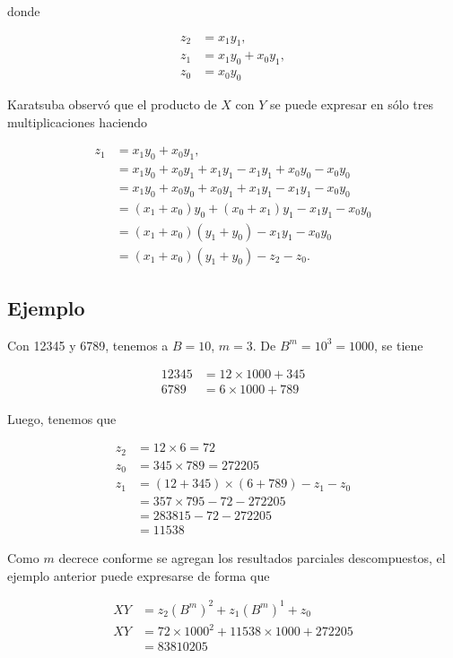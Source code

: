 \documentclass[a4paper,12pt]{article}
\begin{document}
donde 

\begin{align*}
 	z_2 &= x_1 y_1,\\
 	z_1 &= x_1 y_0 + x_0 y_1, \\
  	z_0 &= x_0 y_0
\end{align*}

Karatsuba observó que el producto de $X$ con $Y$ se puede expresar en sólo tres multiplicaciones haciendo

\begin{align*}
 	z_1 &= x_1 y_0 + x_0 y_1, \\
	&= x_1 y_0 + x_0 y_1 + x_1 y_1 - x_1 y_1 + x_0 y_0 - x_0 y_0 \\
	&= x_1 y_0 + x_0 y_0 + x_0 y_1 + x_1 y_1 - x_1 y_1 - x_0 y_0 \\
	&= (x_1 + x_0) y_0 + (x_0 + x_1) y_1 -x_1 y_1 - x_0 y_0\\
 &= 	(x_1 + x_0)(y_1 + y_0) - x_1 y_1 - x_0 y_0\\
	&= (x_1 + x_0)(y_1 + y_0) - z_2 - z_0.
\end{align*}

\subsection*{Ejemplo}
\vspace{1cm}

Con 12345 y 6789, tenemos a $B = 10$, $m = 3$. De $B^m = 10^3 = 1000$, se tiene

\begin{align*}
	12345 &= 12 \times 1000 + 345\\
	6789 &= 6 \times 1000 + 789
\end{align*}

Luego, tenemos que

\begin{align*}
 	z_2 &= 12 \times 6 = 72\\
 	z_0 &= 345 \times 789 = 272205\\
  	z_1 &= (12 + 345) \times (6 + 789) - z_1 - z_0\\
  	&= 357 \times 795 - 72 - 272205\\
  	&= 283815 -72 -272205\\
  	&= 11538
\end{align*}

Como $m$ decrece conforme se agregan los resultados parciales descompuestos, el ejemplo anterior puede expresarse de forma que

\begin{align*}
	XY &= z_2 (B^m)^2 + z_1 (B^m)^1 + z_0\\
	XY &= 72 \times 1000^2 + 11538 \times 1000 + 272205\\
	&= 83810205
\end{align*}
\end{document}
